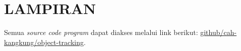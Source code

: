 
\chapter*{LAMPIRAN}%

\appendix
{}
Semua \textit{source code program} dapat diakses melalui link berikut: \href{https://github.com/cah-kangkung/object-tracking}{github/cah-kangkung/object-tracking}.

	

